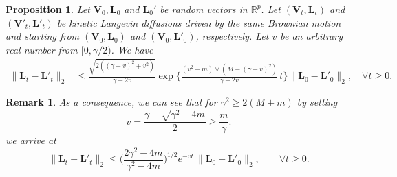 \documentclass[a4paper,bej,preprint,reqno]{imsart}
\newcommand\bL{\boldsymbol L}
\newcommand\bV{\boldsymbol V}
\newtheorem{proposition}{Proposition}
\newtheorem{remark}{Remark}
\begin{document}
\begin{proposition}\label{prop:1}
Let $\bV_0,\bL_0$ and $\bL_0'$ be random vectors in $\mathbb{R}^{p}$. Let $(\bV_t,\bL_t)$
and $(\bV'_t,\bL'_t)$ be kinetic Langevin diffusions driven by the same Brownian motion
and starting from $(\bV_0,\bL_0)$ and $(\bV_0,\bL'_0)$, respectively. Let $v$ be an
arbitrary real number from $[0,\gamma/2)$. We have
\begin{align}
\|\bL_t-\bL'_t\|_2
	&\le \frac{\sqrt{2((\gamma-v)^2+v^2)}}{\gamma-2v}
	\exp\bigg\{\frac{(v^2-m)\vee(M-(\gamma-v)^2)}{\gamma-2v}\,t\bigg\}
	\|\bL_0-\bL'_0\|_2,\quad \forall t\ge 0.
\end{align}
\end{proposition}

\begin{remark}
As a consequence, we can see that for $\gamma^2\ge 2(M+m)$ by setting
$$
v = \frac{\gamma-\sqrt{\gamma^2-4m}}{2}\ge \frac{m}{\gamma}.
$$
we arrive at
\begin{equation}
\|\bL_t-\bL'_t\|_2
	\le  \bigg(\frac{2\gamma^2-4m}{\gamma^2-4m}\bigg)^{1/2}
	e^{-v t}\,\|\bL_0-\bL'_0\|_2,\qquad \forall t\ge 0.
\end{equation}
\end{remark}
\end{document}
